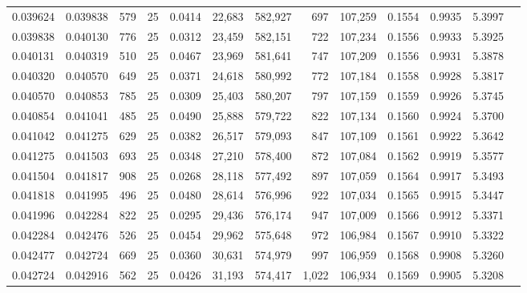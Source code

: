\begin{tabular}{rrrrrrrrrrrrr}
0.039624 & 0.039838 &   579 &  25 &                                     0.0414 &  22,683 & 582,927 &     697 & 107,259 & 0.1554 & 0.9935 & 5.3997 \\
0.039838 & 0.040130 &   776 &  25 &                                     0.0312 &  23,459 & 582,151 &     722 & 107,234 & 0.1556 & 0.9933 & 5.3925 \\
0.040131 & 0.040319 &   510 &  25 &                                     0.0467 &  23,969 & 581,641 &     747 & 107,209 & 0.1556 & 0.9931 & 5.3878 \\
0.040320 & 0.040570 &   649 &  25 &                                     0.0371 &  24,618 & 580,992 &     772 & 107,184 & 0.1558 & 0.9928 & 5.3817 \\
0.040570 & 0.040853 &   785 &  25 &                                     0.0309 &  25,403 & 580,207 &     797 & 107,159 & 0.1559 & 0.9926 & 5.3745 \\
0.040854 & 0.041041 &   485 &  25 &                                     0.0490 &  25,888 & 579,722 &     822 & 107,134 & 0.1560 & 0.9924 & 5.3700 \\
0.041042 & 0.041275 &   629 &  25 &                                     0.0382 &  26,517 & 579,093 &     847 & 107,109 & 0.1561 & 0.9922 & 5.3642 \\
0.041275 & 0.041503 &   693 &  25 &                                     0.0348 &  27,210 & 578,400 &     872 & 107,084 & 0.1562 & 0.9919 & 5.3577 \\
0.041504 & 0.041817 &   908 &  25 &                                     0.0268 &  28,118 & 577,492 &     897 & 107,059 & 0.1564 & 0.9917 & 5.3493 \\
0.041818 & 0.041995 &   496 &  25 &                                     0.0480 &  28,614 & 576,996 &     922 & 107,034 & 0.1565 & 0.9915 & 5.3447 \\
0.041996 & 0.042284 &   822 &  25 &                                     0.0295 &  29,436 & 576,174 &     947 & 107,009 & 0.1566 & 0.9912 & 5.3371 \\
0.042284 & 0.042476 &   526 &  25 &                                     0.0454 &  29,962 & 575,648 &     972 & 106,984 & 0.1567 & 0.9910 & 5.3322 \\
0.042477 & 0.042724 &   669 &  25 &                                     0.0360 &  30,631 & 574,979 &     997 & 106,959 & 0.1568 & 0.9908 & 5.3260 \\
0.042724 & 0.042916 &   562 &  25 &                                     0.0426 &  31,193 & 574,417 &   1,022 & 106,934 & 0.1569 & 0.9905 & 5.3208 \\

\end{tabular}

